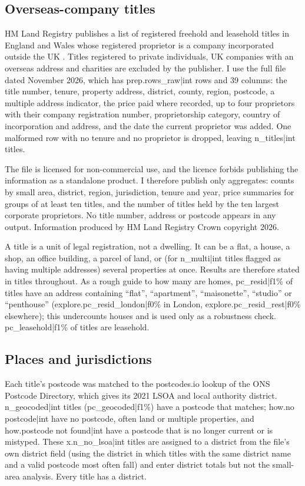 \documentclass[11pt,a4paper]{article}
\begin{document}
\subsection{Overseas-company titles}
HM Land Registry publishes a list of registered freehold and leasehold titles in England and Wales whose registered proprietor is a company incorporated outside the UK \citep{hmlr2026}. Titles registered to private individuals, UK companies with an overseas address and charities are excluded by the publisher. I use the full file dated November 2026, which has {{prep.rows_raw|int}} rows and 39 columns: the title number, tenure, property address, district, county, region, postcode, a multiple address indicator, the price paid where recorded, up to four proprietors with their company registration number, proprietorship category, country of incorporation and address, and the date the current proprietor was added. One malformed row with no tenure and no proprietor is dropped, leaving {{n_titles|int}} titles.

The file is licensed for non-commercial use, and the licence forbids publishing the information as a standalone product. I therefore publish only aggregates: counts by small area, district, region, jurisdiction, tenure and year, price summaries for groups of at least ten titles, and the number of titles held by the ten largest corporate proprietors. No title number, address or postcode appears in any output. Information produced by HM Land Registry \textcopyright{} Crown copyright 2026.

A title is a unit of legal registration, not a dwelling. It can be a flat, a house, a shop, an office building, a parcel of land, or (for {{n_multi|int}} titles flagged as having multiple addresses) several properties at once. Results are therefore stated in titles throughout. As a rough guide to how many are homes, {{pc_resid|f1}}\% of titles have an address containing ``flat'', ``apartment'', ``maisonette'', ``studio'' or ``penthouse'' ({{explore.pc_resid_london|f0}}\% in London, {{explore.pc_resid_rest|f0}}\% elsewhere); this undercounts houses and is used only as a robustness check. {{pc_leasehold|f1}}\% of titles are leasehold.

\subsection{Places and jurisdictions}
Each title's postcode was matched to the postcodes.io lookup of the ONS Postcode Directory, which gives its 2021 LSOA and local authority district. {{n_geocoded|int}} titles ({{pc_geocoded|f1}}\%) have a postcode that matches; {{how.no postcode|int}} have no postcode, often land or multiple properties, and {{how.postcode not found|int}} have a postcode that is no longer current or is mistyped. These {{x.n_no_lsoa|int}} titles are assigned to a district from the file's own district field (using the district in which titles with the same district name and a valid postcode most often fall) and enter district totals but not the small-area analysis. Every title has a district.
\end{document}
